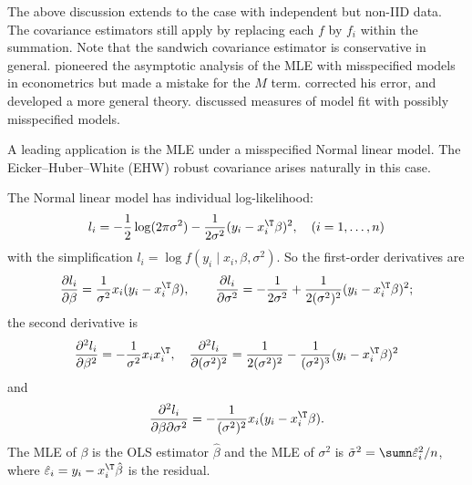 The above discussion extends to the case with independent but non-IID data. The covariance estimators still apply by replacing each $f$ by $f_i$ within the summation. Note that the sandwich covariance estimator is conservative in general. \citet{white1982maximum} pioneered the asymptotic analysis of the MLE with misspecified models in econometrics but made a mistake for the $M$ term. \citet{chow1984maximum} corrected his error, and \citet{abadie2014inference} developed a more general theory. \citet{agresti2002measures} discussed measures of model fit with possibly misspecified models. 


A leading application is the MLE under a misspecified Normal linear model. The Eicker--Huber--White (EHW) robust covariance arises naturally in this case. 


\begin{example}
\label{eg::huber-EHW}
The Normal linear model has individual log-likelihood: 
$$
l_i  = -\frac{1}{2} \log(2\pi\sigma^2) - \frac{1}{2\sigma^2} (y_i - x_i^{\T} \beta)^2 ,\quad (i=1, \ldots, n)
$$
with the simplification $l_i = \log  f(y_i \mid x_i, \beta, \sigma^2).$
So the first-order derivatives are
$$
\frac{\partial l_i   }{ \partial \beta } = \frac{1}{\sigma^2} x_i (y_i - x_i^{\T} \beta), \quad 
\quad 
\frac{\partial l_i  }{ \partial \sigma^2} = -\frac{1}{2 \sigma^2} +  \frac{1}{2(\sigma^2)^2}  (y_i - x_i^{\T} \beta)^2 ;
$$
the second derivative is
$$
\frac{\partial^2 l_i   }{ \partial \beta^2 } =
-  \frac{1}{\sigma^2} x_i x_i^{\T},\quad
\frac{\partial^2 l_i   }{ \partial (\sigma^2)^2 } =
\frac{1}{2(\sigma^2)^2} - \frac{1}{(\sigma^2)^3} (y_i - x_i^{\T} \beta)^2
$$
and
$$
\frac{\partial^2 l_i  }{ \partial \beta \partial \sigma^2} =
-\frac{1}{(\sigma^2)^2}  x_i (y_i - x_i^{\T} \beta).
$$
The MLE of $\beta$ is the OLS estimator $\hat{\beta}$ and the MLE of $\sigma^2$ is $\tilde{\sigma}^2 = \sumn \hat{\varepsilon}_i^2 /n$, where $ \hat{\varepsilon}_i = y_i - x_i^{\T} \hat{\beta}$  is the residual.  


\end{example}
